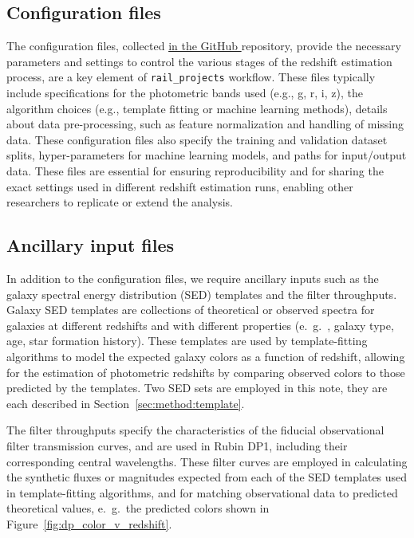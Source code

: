 \subsection{Configuration files}
\label{sec:products:configuration}

The configuration files, collected \href{https://github.com/lsstdesc/rail_project_config}{in the GitHub } repository, provide the necessary parameters and settings to control the various stages of the redshift estimation process, are a key element of \texttt{rail\_projects} workflow.  These files typically include specifications for the photometric bands used (e.g., g, r, i, z), the algorithm choices (e.g., template fitting or machine learning methods), details about data pre-processing, such as feature normalization and handling of missing data.  These configuration files also specify the training and validation dataset splits, hyper-parameters for machine learning models, and paths for input/output data.  These files are essential for ensuring reproducibility and for sharing the exact settings used in different redshift estimation runs, enabling other researchers to replicate or extend the analysis. 


\subsection{Ancillary input files}
\label{sec:products:algo_files}

In addition to the configuration files, we require ancillary inputs such as the galaxy spectral energy distribution (SED) templates and the filter throughputs.  Galaxy SED templates are collections of theoretical or observed spectra for galaxies at different redshifts and with different properties (e.~g.~, galaxy type, age, star formation history).  These templates are used by template-fitting algorithms to model the expected galaxy colors as a function of redshift, allowing for the estimation of photometric redshifts by comparing observed colors to those predicted by the templates.  Two SED sets are employed in this note, they are each described in Section~\ref{sec:method:template}.

The filter throughputs specify the characteristics of the fiducial observational filter transmission curves, and are used in Rubin DP1, including their corresponding central wavelengths.  These filter curves are employed in calculating the synthetic fluxes or magnitudes expected from each of the SED templates used in template-fitting algorithms, and for matching observational data to predicted theoretical values, e.~g.~the predicted colors shown in Figure~\ref{fig:dp_color_v_redshift}.


